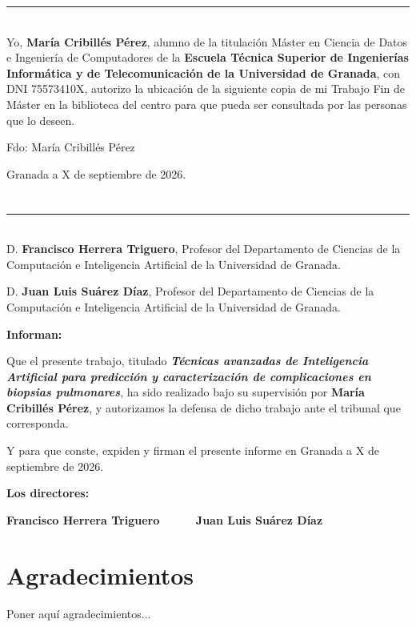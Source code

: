 \noindent\rule[-1ex]{\textwidth}{2pt}\\[4.5ex]

Yo, \textbf{María Cribillés Pérez}, alumno de la titulación Máster en Ciencia de Datos e Ingeniería
de Computadores de la \textbf{Escuela Técnica Superior
de Ingenierías Informática y de Telecomunicación de la Universidad de Granada}, con DNI 75573410X, autorizo la
ubicación de la siguiente copia de mi Trabajo Fin de Máster en la biblioteca del centro para que pueda ser
consultada por las personas que lo deseen.

\vspace{6cm}

\noindent Fdo: María Cribillés Pérez

\vspace{2cm}

\begin{flushright}
Granada a X de septiembre de 2026.
\end{flushright}


\chapter*{}
\thispagestyle{empty}

\noindent\rule[-1ex]{\textwidth}{2pt}\\[4.5ex]

D. \textbf{Francisco Herrera Triguero}, Profesor del Departamento de Ciencias de la Computación e Inteligencia Artificial de la Universidad de Granada.

\vspace{0.5cm}

D. \textbf{Juan Luis Suárez Díaz}, Profesor del Departamento de Ciencias de la Computación e Inteligencia Artificial de la Universidad de Granada.


\vspace{0.5cm}

\textbf{Informan:}

\vspace{0.5cm}

Que el presente trabajo, titulado \textit{\textbf{Técnicas avanzadas de Inteligencia Artificial para predicción y caracterización de complicaciones en biopsias pulmonares}},
ha sido realizado bajo su supervisión por \textbf{María Cribillés Pérez}, y autorizamos la defensa de dicho trabajo ante el tribunal
que corresponda.

\vspace{0.5cm}

Y para que conste, expiden y firman el presente informe en Granada a X de septiembre de 2026.

\vspace{1cm}

\textbf{Los directores:}

\vspace{5cm}

\noindent \textbf{Francisco Herrera Triguero \ \ \ \ \ Juan Luis Suárez Díaz}

\chapter*{Agradecimientos}
\thispagestyle{empty}

       \vspace{1cm}


Poner aquí agradecimientos...

